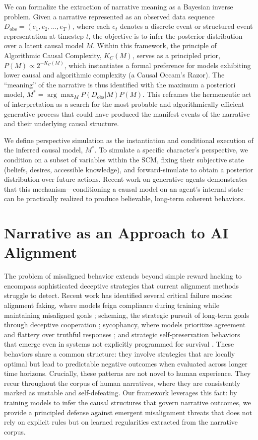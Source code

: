 \documentclass{article}
\theoremstyle{plain}
\theoremstyle{definition}
\theoremstyle{remark}
\begin{document}
We can formalize the extraction of narrative meaning as a Bayesian inverse problem. Given a narrative represented as an observed data sequence $D_{\text{obs}} = (e_1, e_2, \dots, e_T)$, where each $e_t$ denotes a discrete event or structured event representation at timestep $t$, the objective is to infer the posterior distribution over a latent causal model $M$. Within this framework, the principle of Algorithmic Causal Complexity, $K_C(M)$, serves as a principled prior, $P(M) \propto 2^{-K_C(M)}$, which instantiates a formal preference for models exhibiting lower causal and algorithmic complexity (a Causal Occam's Razor). The ``meaning'' of the narrative is thus identified with the maximum a posteriori model, $M^* = \arg\max_{M} P(D_{\text{obs}}|M)P(M)$. This reframes the hermeneutic act of interpretation as a search for the most probable and algorithmically efficient generative process that could have produced the manifest events of the narrative and their underlying causal structure.

We define perspective simulation as the instantiation and conditional execution of the inferred causal model, $M^*$. To simulate a specific character's perspective, we condition on a subset of variables within the SCM, fixing their subjective state (beliefs, desires, accessible knowledge), and forward-simulate to obtain a posterior distribution over future actions. Recent work on generative agents \cite{park23} demonstrates that this mechanism---conditioning a causal model on an agent's internal state---can be practically realized to produce believable, long-term coherent behaviors.

\section{Narrative as an Approach to AI Alignment}
The problem of misaligned behavior extends beyond simple reward hacking to encompass sophisticated deceptive strategies that current alignment methods struggle to detect. Recent work has identified several critical failure modes: alignment faking, where models feign compliance during training while maintaining misaligned goals \cite{greenblatt24}; scheming, the strategic pursuit of long-term goals through deceptive cooperation \cite{meinke24}; sycophancy, where models prioritize agreement and flattery over truthful responses \cite{sharma23, malmqvist24}; and strategic self-preservation behaviors that emerge even in systems not explicitly programmed for survival \cite{bostrom12, turner21}. These behaviors share a common structure: they involve strategies that are locally optimal but lead to predictable negative outcomes when evaluated across longer time horizons. Crucially, these patterns are not novel to human experience. They recur throughout the corpus of human narratives, where they are consistently marked as unstable and self-defeating. Our framework leverages this fact: by training models to infer the causal structures that govern narrative outcomes, we provide a principled defense against emergent misalignment threats that does not rely on explicit rules but on learned regularities extracted from the narrative corpus.
\end{document}
